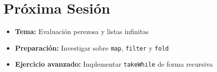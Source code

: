 \documentclass[12pt]{article}
\begin{document}
\section*{Próxima Sesión}
\begin{itemize}
  \item \textbf{Tema:} Evaluación perezosa y listas infinitas
  \item \textbf{Preparación:} Investigar sobre \texttt{map}, \texttt{filter} y \texttt{fold}
  \item \textbf{Ejercicio avanzado:} Implementar \texttt{takeWhile} de forma recursiva
\end{itemize}
\end{document}
